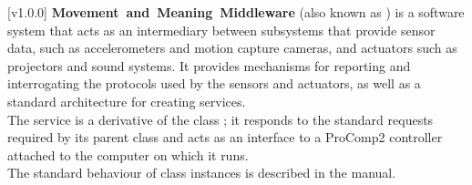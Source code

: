 [v1.0.0]
\textbf{Movement~and~Meaning~Middleware} (also known as \mplusm) is a software system
that acts as an intermediary between subsystems that provide sensor data, such as
accelerometers and motion capture cameras, and actuators such as projectors and sound
systems.
It provides mechanisms for reporting and interrogating the protocols used by the sensors
and actuators, as well as a standard architecture for creating services.\\

The \PCtwoI{} service is a derivative of the \mplusm{} class ;
it responds to the standard requests required by its parent class and acts as an interface
to a ProComp2 controller attached to the computer on which it runs.\\

The standard behaviour of  class instances is described in
the \emph{\MMM} manual.
\primaryEnd{}
